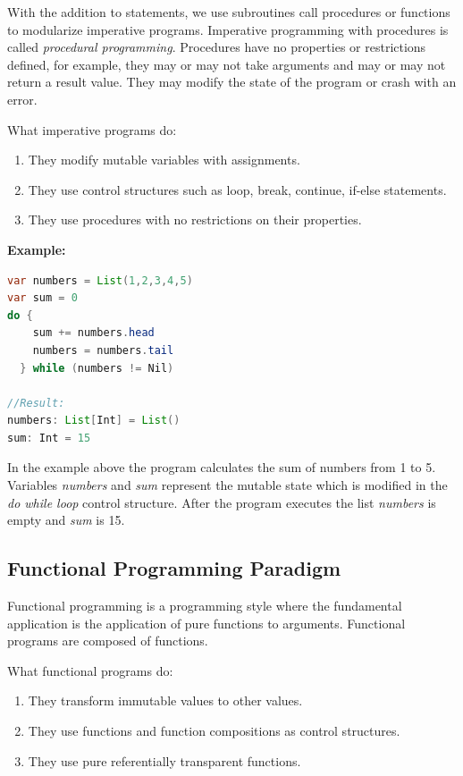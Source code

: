\documentclass[12pt,twoside,a4paper]{report}
\begin{document}
With the addition to statements, we use subroutines call procedures or functions to modularize imperative programs. Imperative programming with procedures is called \emph{procedural programming}. Procedures have no properties or restrictions defined, for example, they may or may not take arguments and may or may not return a result value. They may modify the state of the program or crash with an error.

What imperative programs do:

\begin{enumerate}\itemsep1pt \parskip0pt 
\item They modify mutable variables with assignments.
\item They use control structures such as loop, break, continue, if-else statements.
\item They use procedures with no restrictions on their properties.
\end{enumerate}

\textbf{Example:}
\begin{lstlisting}[language=java]
var numbers = List(1,2,3,4,5)
var sum = 0
do {
    sum += numbers.head
    numbers = numbers.tail
  } while (numbers != Nil)

//Result:
numbers: List[Int] = List()
sum: Int = 15
\end{lstlisting}

In the example above the program calculates the sum of numbers from 1 to 5. Variables \emph{numbers} and \emph{sum} represent the mutable state which is modified in the \emph{do while loop} control structure. After the program executes the list \emph{numbers} is empty and \emph{sum} is 15.

\subsection{Functional Programming Paradigm}\label{6.3.1}

Functional programming is a programming style where the fundamental application is the application of pure functions to arguments. Functional programs are composed of functions.

What functional programs do:

\begin{enumerate}\itemsep1pt \parskip0pt 
\item They transform immutable values to other values.
\item They use functions and function compositions as control structures.
\item They use pure referentially transparent functions.
\end{enumerate}
\end{document}
